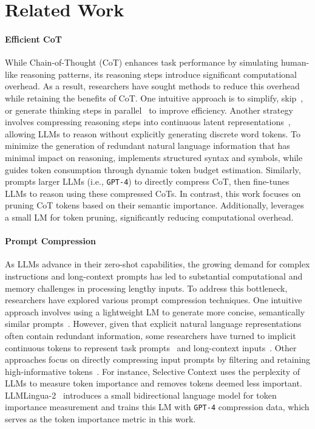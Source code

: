 \section{Related Work}

\paragraph{Efficient CoT} While Chain-of-Thought (CoT) enhances task performance by simulating human-like reasoning patterns, its reasoning steps introduce significant computational overhead. As a result, researchers have sought methods to reduce this overhead while retaining the benefits of CoT. One intuitive approach is to simplify, skip~\cite{marconato2024not, Ding:2024cotshortcut, liu2024skipstep}, or generate thinking steps in parallel~\cite{ning2023skeleton} to improve efficiency. Another strategy involves compressing reasoning steps into continuous latent representations~\cite{goyal2024think, deng2024explicit, hao2024training, cheng2024compressed}, allowing LLMs to reason without explicitly generating discrete word tokens. To minimize the generation of redundant natural language information that has minimal impact on reasoning, \citet{hu2023chain} implements structured syntax and symbols, while \citet{han2024token} guides token consumption through dynamic token budget estimation. Similarly, \citet{kang2024c3ot} prompts larger LLMs (i.e., \texttt{GPT-4}) to directly compress CoT, then fine-tunes LLMs to reason using these compressed CoTs. In contrast, this work focuses on pruning CoT tokens based on their semantic importance. Additionally, \method leverages a small LM for token pruning, significantly reducing computational overhead.

\paragraph{Prompt Compression} As LLMs advance in their zero-shot capabilities, the growing demand for complex instructions and long-context prompts has led to substantial computational and memory challenges in processing lengthy inputs. To address this bottleneck, researchers have explored various prompt compression techniques. One intuitive approach involves using a lightweight LM to generate more concise, semantically similar prompts~\cite{chuang-etal-2024-learning}. However, given that explicit natural language representations often contain redundant information, some researchers have turned to implicit continuous tokens to represent task prompts~\cite{wingate-etal-2022-prompt, mu2024learning} and long-context inputs~\cite{chevalier-etal-2023-adapting, ge2024incontext, mohtashami2023randomaccess}. Other approaches focus on directly compressing input prompts by filtering and retaining high-informative tokens~\cite{li:2023selective, jiang2023:llmlingua, pan:2024llmlingua2}. For instance, Selective Context uses the perplexity of LLMs to measure token importance and removes tokens deemed less important. LLMLingua-2~\cite{pan:2024llmlingua2} introduces a small bidirectional language model for token importance measurement and trains this LM with \texttt{GPT-4} compression data, which serves as the token importance metric in this work.